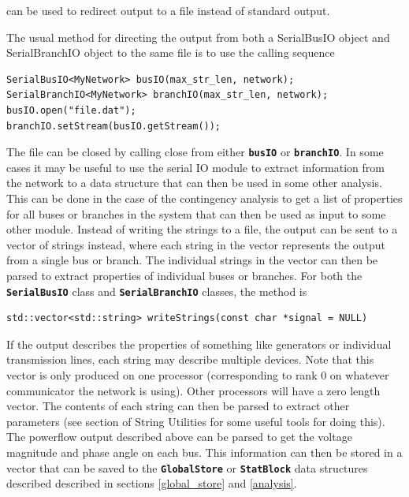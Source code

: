 can be used to redirect output to a file instead of standard output.

The usual method for directing the output from both a SerialBusIO object and SerialBranchIO object to the same file is to use the calling sequence

{
\color{red}
\begin{Verbatim}[fontseries=b]
SerialBusIO<MyNetwork> busIO(max_str_len, network);
SerialBranchIO<MyNetwork> branchIO(max_str_len, network);
busIO.open("file.dat");
branchIO.setStream(busIO.getStream());
\end{Verbatim}
}

The file can be closed by calling close from either \texttt{\textbf{busIO}} or \texttt{\textbf{branchIO}}.
In some cases it may be useful to use the serial IO module to extract information from the network to a data structure that can then be used in some other analysis. This can be done in the case of the contingency analysis to get a list of properties for all buses or branches in the system that can then be used as input to some other module. Instead of writing the strings to a file, the output can be sent to a vector of strings instead, where each string in the vector represents the output from a single bus or branch. The individual strings in the vector can then be parsed to extract properties of individual buses or branches. For both the \texttt{\textbf{SerialBusIO}} class and \texttt{\textbf{SerialBranchIO}} classes, the method is

{
\color{red}
\begin{Verbatim}[fontseries=b]
std::vector<std::string> writeStrings(const char *signal = NULL)
\end{Verbatim}
}

If the output describes the properties of something like generators or
individual transmission lines, each string may describe multiple devices. Note
that this vector is only produced on one processor (corresponding to rank 0 on
whatever communicator the network is using). Other processors will have a zero
length vector. The contents of each string can then be parsed to extract other
parameters (see section of String Utilities for some useful tools for doing
this). The powerflow output described above can be parsed to get the voltage
magnitude and phase angle on each bus. This information can then be stored in a
vector that can be saved to the \texttt{\textbf{GlobalStore}} or
\texttt{\textbf{StatBlock}} data structures described described in sections
\ref{global_store} and \ref{analysis}.
